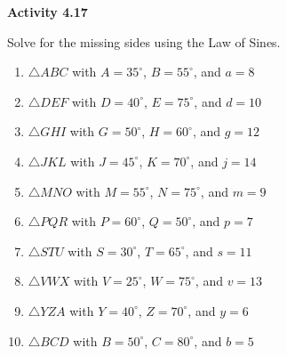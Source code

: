 \vspace{0.3ex}
\noindent\textbf{Activity 4.17}

\vspace{0.2ex}

Solve for the missing sides using the Law of Sines. 

\begin{enumerate}
    \item \(\triangle ABC\) with \(A = 35^\circ\), \(B = 55^\circ\), and \(a = 8\)
    \item \(\triangle DEF\) with \(D = 40^\circ\), \(E = 75^\circ\), and \(d = 10\)
    \item \(\triangle GHI\) with \(G = 50^\circ\), \(H = 60^\circ\), and \(g = 12\)
    \item \(\triangle JKL\) with \(J = 45^\circ\), \(K = 70^\circ\), and \(j = 14\)
    \item \(\triangle MNO\) with \(M = 55^\circ\), \(N = 75^\circ\), and \(m = 9\)
    \item \(\triangle PQR\) with \(P = 60^\circ\), \(Q = 50^\circ\), and \(p = 7\)
    \item \(\triangle STU\) with \(S = 30^\circ\), \(T = 65^\circ\), and \(s = 11\)
    \item \(\triangle VWX\) with \(V = 25^\circ\), \(W = 75^\circ\), and \(v = 13\)
    \item \(\triangle YZA\) with \(Y = 40^\circ\), \(Z = 70^\circ\), and \(y = 6\)
    \item \(\triangle BCD\) with \(B = 50^\circ\), \(C = 80^\circ\), and \(b = 5\)
\end{enumerate}
